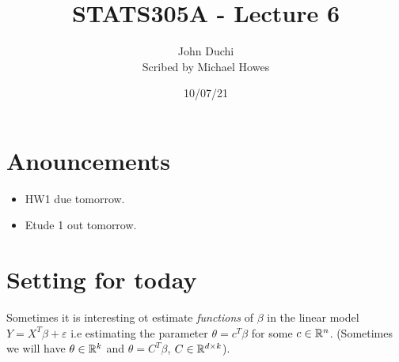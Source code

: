 




\title{STATS305A - Lecture 6}
\author{John Duchi\\ Scribed by Michael Howes}
\date{10/07/21}

\pagestyle{fancy}
\fancyhf{}


\maketitle
\tableofcontents
\section{Anouncements}
\begin{itemize}
    \item HW1 due tomorrow.
    \item Etude 1 out tomorrow.
\end{itemize}
\section{Setting for today}
Sometimes it is interesting ot estimate \emph{functions} of $\beta$ in the linear model $Y=X^T\beta + \varepsilon$ i.e estimating the parameter $\theta = c^T\beta$ for some $c \in {\mathbb R}^n$. (Sometimes we will have $\theta \in {\mathbb R}^k$ and $\theta = C^T\beta$, $C \in {\mathbb R}^{d\times k}$).
